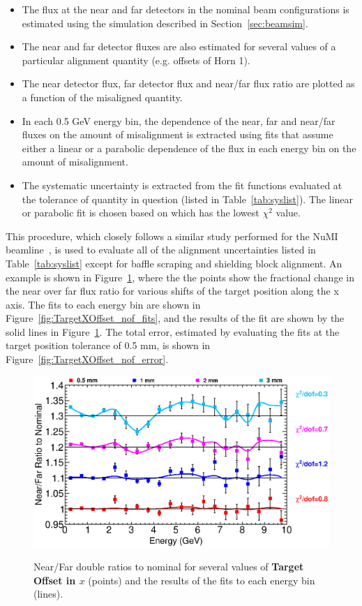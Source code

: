 \begin{itemize}
\item The flux at the near and far detectors in the nominal beam configurations is estimated using the simulation described in Section~\ref{sec:beamsim}.
\item The near and far detector fluxes are also estimated for several values of a particular alignment quantity (e.g. offsets of Horn 1).  
\item The near detector flux, far detector flux and near/far flux ratio are plotted as a function of the misaligned quantity.  
\item In each 0.5 GeV energy bin,  the dependence of the near, far and near/far fluxes on the amount of misalignment is extracted using fits that assume either a linear or a parabolic dependence of the flux in each energy bin on the amount of misalignment. 
\item The systematic uncertainty is extracted from the fit functions evaluated at the tolerance of quantity in question (listed in Table~\ref{tab:syslist}).  The linear or parabolic fit is chosen based on which has the lowest $\chi^2$ value.
\end{itemize}

This procedure, which closely follows a similar study performed for the NuMI beamline~\cite{numitdh}, is used to evaluate all of the alignment uncertainties listed in Table~\ref{tab:syslist} except for baffle scraping and shielding block alignment. An example is shown in Figure~\ref{fig:TargetXOffset_nof_summary}, where the the points show the fractional change in the near over far flux ratio for various shifts of the target position along the x axis.  The fits to each energy bin are shown in Figure~\ref{fig:TargetXOffset_nof_fits}, and the results of the fit are shown by the solid lines in Figure~\ref{fig:TargetXOffset_nof_summary}.  The total error, estimated by evaluating the fits at the target position tolerance of 0.5 mm, is shown in Figure~\ref{fig:TargetXOffset_nof_error}.

\begin{figure}[ht]
\label{fig:TargetXOffset_nof_summary}
  \begin{center}
    {\includegraphics[width=6.0in]{figures/TargetXOffset_nof_summary.eps}}
  \end{center}
\caption{ Near/Far double ratios to nominal for several values of {\bf Target Offset in $x$} (points) and the results of the fits to each energy bin (lines).}
\end{figure}

